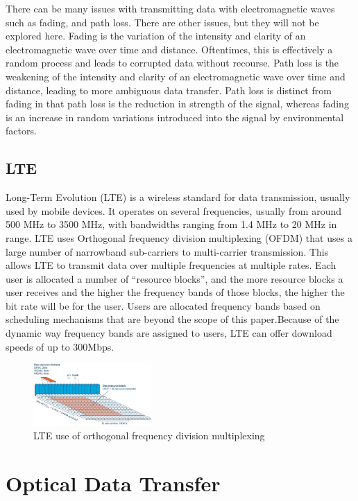 \documentclass[11pt]{article}
\begin{document}
There can be many issues with transmitting data with electromagnetic waves such as fading, and path loss. There are other issues, but they will not be explored here. Fading is the variation of the intensity and clarity of an electromagnetic wave over time and distance. Oftentimes, this is effectively a random process and leads to corrupted data without recourse. Path loss is the weakening of the intensity and clarity of an electromagnetic wave over time and distance, leading to more ambiguous data transfer. Path loss is distinct from fading in that path loss is the reduction in strength of the signal, whereas fading is an increase in random variations introduced into the signal by environmental factors. 

\subsection{LTE}

Long-Term Evolution (LTE) is a wireless standard for data transmission, usually used by mobile devices. It operates on several frequencies, usually from around 500 MHz to 3500 MHz, with bandwidths ranging from 1.4 MHz to 20 MHz in range. LTE uses Orthogonal frequency division multiplexing (OFDM) that uses a large number of narrowband sub-carriers to multi-carrier transmission. This allows LTE to transmit data over multiple frequencies at multiple rates. Each user is allocated a number of “resource blocks”, and the more resource blocks a user receives and the higher the frequency bands of those blocks, the higher the bit rate will be for the user. Users are allocated frequency bands based on scheduling mechanisms that are beyond the scope of this paper.Because of the dynamic way frequency bands are assigned to users, LTE can offer download speeds of up to 300Mbps.

\begin{figure}[!htbp]
    \centering
    \includegraphics[width=0.4\textwidth]{OFDMDiagramForPaper.png}
    \caption{LTE use of orthogonal frequency division multiplexing}
    \label{fig:OFDMDiagram}

\end{figure}

\section{Optical Data Transfer}
\end{document}
